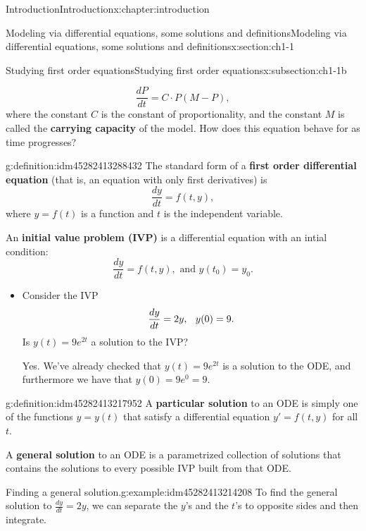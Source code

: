 \documentclass[oneside,10pt,]{book}
\newcommand{\terminology}[1]{\textbf{#1}}
\numberwithin{equation}{section}
\numberwithin{equation}{section}
\begin{document}
\begin{chapterptx}{Introduction}{}{Introduction}{}{}{x:chapter:introduction}
\begin{sectionptx}{Modeling via differential equations, some solutions and definitions}{}{Modeling via differential equations, some solutions and definitions}{}{}{x:section:ch1-1}
\begin{subsectionptx}{Studying first order equations}{}{Studying first order equations}{}{}{x:subsection:ch1-1b}
\begin{itemize}[label=\textbullet]
\begin{equation*}
\frac{dP}{dt} = C \cdot P(M - P),
\end{equation*}
where the constant \(C\) is the constant of proportionality, and the constant \(M\) is called the \terminology{carrying capacity} of the model. How does this equation behave for as time progresses?%
\end{itemize}
\begin{definition}{}{g:definition:idm45282413288432}%
The standard form of a \terminology{first order differential equation} (that is, an equation with only first derivatives) is%
\begin{equation*}
\frac{dy}{dt} = f(t,y),
\end{equation*}
where \(y = f(t)\) is a function and \(t\) is the independent variable.%
\par
An \terminology{initial value problem (IVP)} is a differential equation with an intial condition:%
\begin{equation*}
\frac{dy}{dt} = f(t, y), \text{ and } y(t_0) = y_0.
\end{equation*}
%
\end{definition}
%
\begin{itemize}[label=\textbullet]
\item{}Consider the IVP%
\begin{equation*}
\frac{dy}{dt} = 2y, \hspace{.1in} y(0) =9.
\end{equation*}
Is \(y(t) = 9e^{2t}\) a solution to the IVP?%
\par
Yes. We've already checked that \(y(t) = 9e^{2t}\) is a solution to the ODE, and furthermore we have that \(y(0) = 9e^{0} = 9\).%
\end{itemize}
\begin{definition}{}{g:definition:idm45282413217952}%
A \terminology{particular solution} to an ODE is simply one of the functions \(y = y(t)\) that satisfy a differential equation \(y' = f(t,y)\) for all \(t\).%
\par
A \terminology{general solution} to an ODE is a parametrized collection of solutions that contains the solutions to every possible IVP built from that ODE.%
\end{definition}
\begin{example}{Finding a general solution.}{g:example:idm45282413214208}%
 To find the general solution to \(\frac{dy}{dt} = 2y\), we can separate the \(y\)'s and the \(t\)'s to opposite sides and then integrate.%
\begin{align*}

\end{align*}
\end{example}
\end{subsectionptx}
\end{sectionptx}
\end{chapterptx}
\end{document}
